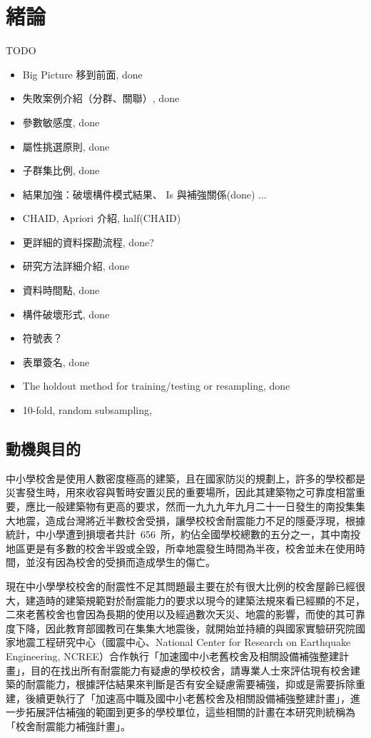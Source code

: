 % 
\chapter{緒論}
\label{cha:intro} 

TODO

\begin{itemize}
\item Big Picture 移到前面, done
\item 失敗案例介紹（分群、關聯）, done
\item 參數敏感度, done
\item 屬性挑選原則, done
\item 子群集比例, done
\item 結果加強：破壞構件模式結果、 Is 與補強關係(done) ...
\item CHAID, Apriori 介紹, half(CHAID)
\item 更詳細的資料探勘流程, done?
\item 研究方法詳細介紹, done
\item 資料時間點, done
\item 構件破壞形式, done
\item 符號表？
\item 表單簽名, done
\item The holdout method for training/testing or resampling, done
\item 10-fold, random subsampling, %
\end{itemize}

\section{動機與目的}

中小學校舍是使用人數密度極高的建築，且在國家防災的規劃上，許多的學校都是災害發生時，用來收容與暫時安置災民的重要場所，因此其建築物之可靠度相當重要，應比一般建築物有更高的要求，然而一九九九年九月二十一日發生的南投集集大地震，造成台灣將近半數校舍受損，讓學校校舍耐震能力不足的隱憂浮現，根據統計，中小學遭到損壞者共計~656~所，約佔全國學校總數的五分之一，其中南投地區更是有多數的校舍半毀或全毀，所幸地震發生時間為半夜，校舍並未在使用時間，並沒有因為校舍的受損而造成學生的傷亡。

現在中小學學校校舍的耐震性不足其問題最主要在於有很大比例的校舍屋齡已經很大，建造時的建築規範對於耐震能力的要求以現今的建築法規來看已經顯的不足，二來老舊校舍也會因為長期的使用以及經過數次天災、地震的影響，而使的其可靠度下降，因此教育部國教司在集集大地震後，就開始並持續的與國家實驗研究院國家地震工程研究中心（國震中心、National Center for Research on Earthquake Engineering, NCREE）合作執行「加速國中小老舊校舍及相關設備補強整建計畫」，目的在找出所有耐震能力有疑慮的學校校舍，請專業人士來評估現有校舍建築的耐震能力，根據評估結果來判斷是否有安全疑慮需要補強，抑或是需要拆除重建，後續更執行了「加速高中職及國中小老舊校舍及相關設備補強整建計畫」，進一步拓展評估補強的範圍到更多的學校單位，這些相關的計畫在本研究則統稱為「校舍耐震能力補強計畫」。

